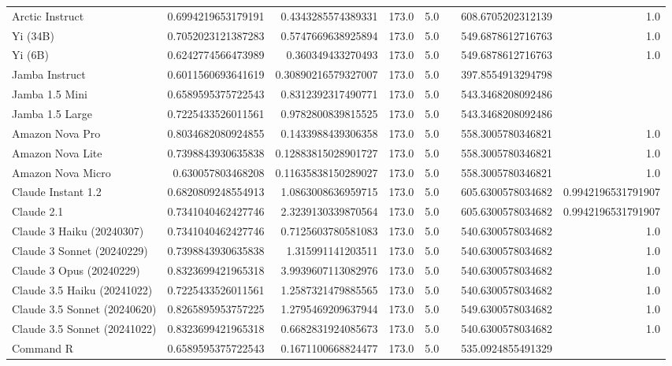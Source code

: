 \begin{table}[htp]
{\begin{tabular}{lrrrrrrr}
Arctic Instruct & 0.6994219653179191 & 0.4343285574389331 & 173.0 & 5.0 &  & 608.6705202312139 & 1.0 \\
Yi (34B) & 0.7052023121387283 & 0.5747669638925894 & 173.0 & 5.0 &  & 549.6878612716763 & 1.0 \\
Yi (6B) & 0.6242774566473989 & 0.360349433270493 & 173.0 & 5.0 &  & 549.6878612716763 & 1.0 \\
Jamba Instruct & 0.6011560693641619 & 0.30890216579327007 & 173.0 & 5.0 &  & 397.8554913294798 &  \\
Jamba 1.5 Mini & 0.6589595375722543 & 0.8312392317490771 & 173.0 & 5.0 &  & 543.3468208092486 &  \\
Jamba 1.5 Large & 0.7225433526011561 & 0.9782800839815525 & 173.0 & 5.0 &  & 543.3468208092486 &  \\
Amazon Nova Pro & 0.8034682080924855 & 0.1433988439306358 & 173.0 & 5.0 &  & 558.3005780346821 & 1.0 \\
Amazon Nova Lite & 0.7398843930635838 & 0.12883815028901727 & 173.0 & 5.0 &  & 558.3005780346821 & 1.0 \\
Amazon Nova Micro & 0.630057803468208 & 0.11635838150289027 & 173.0 & 5.0 &  & 558.3005780346821 & 1.0 \\
Claude Instant 1.2 & 0.6820809248554913 & 1.0863008636959715 & 173.0 & 5.0 &  & 605.6300578034682 & 0.9942196531791907 \\
Claude 2.1 & 0.7341040462427746 & 2.3239130339870564 & 173.0 & 5.0 &  & 605.6300578034682 & 0.9942196531791907 \\
Claude 3 Haiku (20240307) & 0.7341040462427746 & 0.7125603780581083 & 173.0 & 5.0 &  & 540.6300578034682 & 1.0 \\
Claude 3 Sonnet (20240229) & 0.7398843930635838 & 1.315991141203511 & 173.0 & 5.0 &  & 540.6300578034682 & 1.0 \\
Claude 3 Opus (20240229) & 0.8323699421965318 & 3.9939607113082976 & 173.0 & 5.0 &  & 540.6300578034682 & 1.0 \\
Claude 3.5 Haiku (20241022) & 0.7225433526011561 & 1.2587321479885565 & 173.0 & 5.0 &  & 540.6300578034682 & 1.0 \\
Claude 3.5 Sonnet (20240620) & 0.8265895953757225 & 1.2795469209637944 & 173.0 & 5.0 &  & 549.6300578034682 & 1.0 \\
Claude 3.5 Sonnet (20241022) & 0.8323699421965318 & 0.6682831924085673 & 173.0 & 5.0 &  & 540.6300578034682 & 1.0 \\
Command R & 0.6589595375722543 & 0.1671100668824477 & 173.0 & 5.0 &  & 535.0924855491329 &  \\

\end{tabular}}
\end{table}
